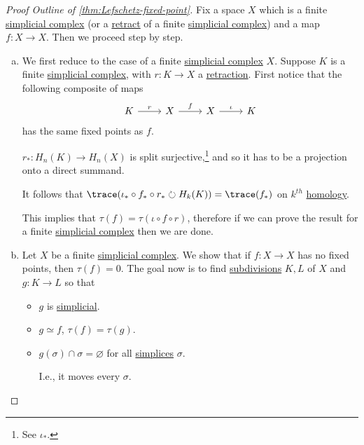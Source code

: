 \begin{proof}[Proof Outline of \autoref{thm:Lefschetz-fixed-point}]
	Fix a space \(X\) which is a finite \hyperref[def:simplicial-complex]{simplicial complex} (or a \hyperref[def:retract]{retract} of a finite \hyperref[def:simplicial-complex]{simplicial complex}) and a map \(f \colon X \to X\). Then we proceed step by step.
	\begin{enumerate}[(a)]
		\item We first reduce to the case of a finite \hyperref[def:simplicial-complex]{simplicial complex} \(X\). Suppose \(K\) is a finite \hyperref[def:simplicial-complex]{simplicial complex}, with \(r \colon K \to X\) a \hyperref[def:retraction]{retraction}. First notice that the following composite of maps
		      \[
			      \begin{tikzcd}
				      K & X & X & K
				      \arrow["r", from=1-1, to=1-2]
				      \arrow["f", from=1-2, to=1-3]
				      \arrow["\iota", from=1-3, to=1-4]
			      \end{tikzcd}
		      \]
		      has the same fixed points as \(f\).
		      \begin{exercise}
			      \(r_\ast \colon H_n(K) \to H_n(X)\) is split surjective,\footnote{See \(\iota_\ast\).} and so it has to be a projection onto a direct summand.
		      \end{exercise}

		      \begin{exercise}
			      It follows that \(\trace(\iota_\ast \circ f_\ast \circ r_\ast \circlearrowright H_k(K)) = \trace(f_\ast)\) on \(k^{th}\) \hyperref[def:homology-group]{homology}.
		      \end{exercise}

		      This implies that \(\tau(f) = \tau(\iota \circ f \circ r)\), therefore if we can prove the result for a finite \hyperref[def:simplicial-complex]{simplicial complex} then we are done.
		\item Let \(X\) be a finite \hyperref[def:simplicial-complex]{simplicial complex}. We show that if \(f \colon X \to X\) has no fixed points, then \(\tau(f) = 0\). The goal now is to find \hyperref[eg:Barycentric-subdivision]{subdivisions} \(K, L\) of \(X\) and \(g \colon K \to L\) so that
		      \begin{itemize}
			      \item \(g\) is \hyperref[def:simplicial-map]{simplicial}.
			      \item \(g \simeq f\), \(\tau(f) = \tau(g)\).
			      \item \(g(\sigma) \cap \sigma = \varnothing \) for all \hyperref[def:standard-simplex]{simplices} \(\sigma\).
			            \begin{note}
				            I.e., it moves every \(\sigma \).
			            \end{note}
		      \end{itemize}


\end{enumerate}
\end{proof}
